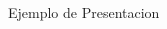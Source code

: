 \documentclass[12pt]{beamer}
\begin{document}
    \begin{frame}{Ejemplo de Presentacion}
        \begin{columns}
            \begin{column}{0.5 \textwidth}
            \end{column}
            \begin{column}{0.5 \textwidth}
            \end{column}
        \end{columns}
    \end{frame}
\end{document}
